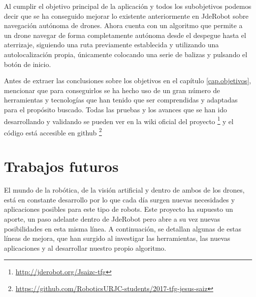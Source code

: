 \hspace{1cm} Al cumplir el objetivo principal de la aplicación y todos los subobjetivos podemos decir que se ha conseguido mejorar lo existente anteriormente en JdeRobot sobre navegación autónoma de drones. Ahora cuenta con un algoritmo que permite a un drone navegar de forma completamente autónoma desde el despegue hasta el aterrizaje, siguiendo una ruta previamente establecida y utilizando una autolocalización propia, únicamente colocando una serie de balizas y pulsando el botón de inicio.

\hspace{1cm} Antes de extraer las conclusiones sobre los objetivos en el capítulo \ref{cap.objetivos}, mencionar que para conseguirlos se ha hecho uso de un gran número de herramientas y tecnologías que han tenido que ser comprendidas y adaptadas para el propósito buscado. Todas las pruebas y los avances que se han ido desarrollando y validando se pueden ver en la wiki oficial del proyecto \footnote{\url{http://jderobot.org/Jsaizc-tfg}} y el código está accesible en github \footnote{\url{https://github.com/RoboticsURJC-students/2017-tfg-jesus-saiz}} 

\section{Trabajos futuros}
\hspace{1cm} El mundo de la robótica, de la visión artificial y dentro de ambos de los drones, está en constante desarrollo por lo que cada día surgen nuevas necesidades y aplicaciones posibles para este tipo de robots. Este proyecto ha supuesto un aporte, un paso adelante dentro de JdeRobot pero abre a su vez nuevas posibilidades en esta misma línea. A continuación, se detallan algunas de estas líneas de mejora, que han surgido al investigar las herramientas, las nuevas aplicaciones y al desarrollar nuestro propio algoritmo.

